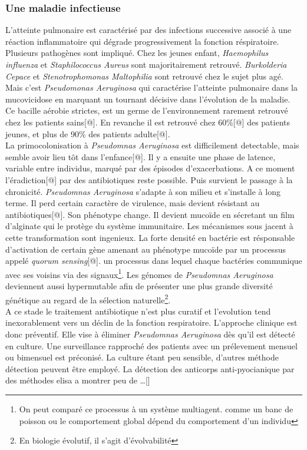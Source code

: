 \documentclass[12pt,a4paper]{article}
\begin{document}
\subsubsection{Une maladie infectieuse}

L’atteinte pulmonaire est caractérisé par des infections successive associé à une réaction inflammatoire qui dégrade progressivement la fonction réspiratoire.
Plusieurs pathogènes sont impliqué. Chez les jeunes enfant, \textit{Haemophilus influenza} et \textit{Staphilococcus Aureus} sont majoritairement retrouvé. \textit{Burkolderia Cepace} et \textit{Stenotrophomonas Maltophilia} sont retrouvé chez le sujet plus agé.
Mais c’est \textit{Pseudomonas Aeruginosa} qui caractérise l’atteinte pulmonaire dans la mucovicidose en marquant un tournant décisive dans l’évolution de la maladie. Ce bacille aérobie strictes, est un germe de l'environnement rarement retrouvé chez les patients sains[@]. En revanche il est retrouvé chez 60\%[@] des patients jeunes, et plus de 90\% des patients adulte[@].\\
La primocolonisation à \textit{Pseudomnas Aeruginosa} est difficilement detectable, mais semble avoir lieu tôt dans l’enfance[@]. Il y a ensuite une phase de latence, variable entre individus, marqué par des épisodes d’exacerbations. A ce moment l’éradiction[@] par des antibiotiques reste possible.
Puis survient le passage à la chronicité. \textit{Pseudomnas Aeruginosa} s'adapte à son milieu et s’installe à long terme. Il perd certain caractère de virulence, mais devient résistant au antibiotiques[@]. Son phénotype change. Il devient mucoïde en sécretant un film d’alginate qui le protège du système immunitaire. Les mécanismes sous jacent à cette transformation sont ingenieux. La forte densité en bactérie est résponsable d’activation de certain gène amenant au phénotype mucoïde par un processus appelé \textit{quorum sensing}[@]. un processus dans lequel chaque bactéries communique avec ses voisins via des signaux\footnote{On peut comparé ce processus à un système multiagent. comme un banc de poisson ou le comportement global dépend du comportement d’un individu}.
Les génomes de \textit{Pseudomnas Aeruginosa} deviennent aussi hypermutable afin de présenter une plus grande diversité génétique au regard de la sélection naturelle\footnote{En biologie évolutif, il s'agit d'évolvabilité}. \\
A ce stade le traitement antibiotique n’est plus curatif et l'evolution tend inexorablement vers un déclin de la fonction respiratoire.
L'approche clinique est donc préventif. Elle  vise à éliminer \textit{Pseudomnas Aeruginosa} dès qu’il est détecté en culture. Une surveillance rapproché des patients avec un prélevement mensuel ou bimensuel est préconisé. La culture étant peu sensible, d’autres méthode détection peuvent être employé. La détection des anticorps anti-pyocianique par des méthodes elisa a montrer peu de …[]
\end{document}
